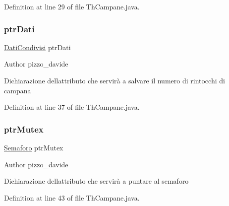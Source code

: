 Definition at line 29 of file Th\+Campane.\+java.

\mbox{\label{classcampane_1_1_th_campane_af3ade885f29d5a10bb194e8e3e1480c5}} 
\subsubsection{\texorpdfstring{ptr\+Dati}{ptrDati}}
{\footnotesize\ttfamily \hyperlink{classcampane_1_1_dati_condivisi}{Dati\+Condivisi} ptr\+Dati\hspace{0.3cm}{\ttfamily [private]}}

\begin{DoxyAuthor}{Author}
pizzo\+\_\+davide
\end{DoxyAuthor}
Dichiarazione dell\textquotesingle{}attributo che servirà a salvare il numero di rintocchi di campana 

Definition at line 37 of file Th\+Campane.\+java.

\mbox{\label{classcampane_1_1_th_campane_a83b472201ffa84b0afd563d6028fd4d8}} 
\subsubsection{\texorpdfstring{ptr\+Mutex}{ptrMutex}}
{\footnotesize\ttfamily \hyperlink{classcampane_1_1_semaforo}{Semaforo} ptr\+Mutex\hspace{0.3cm}{\ttfamily [private]}}

\begin{DoxyAuthor}{Author}
pizzo\+\_\+davide
\end{DoxyAuthor}
Dichiarazione dell\textquotesingle{}attributo che servirà a puntare al semaforo 

Definition at line 43 of file Th\+Campane.\+java.

\mbox{\label{classcampane_1_1_th_campane_a8e2bdcee9d569ad59a224068e53bd3f2}} 

